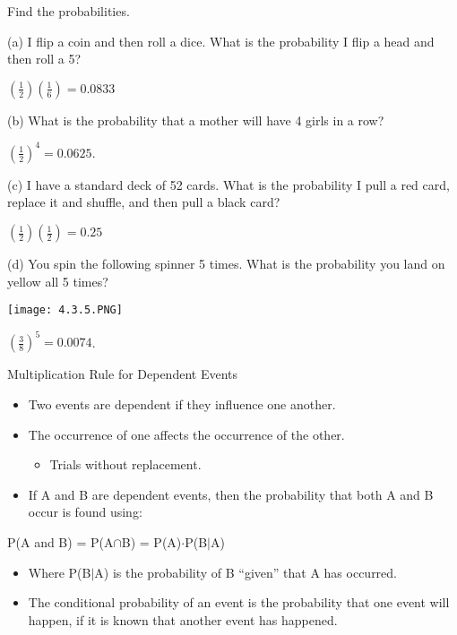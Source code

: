 \documentclass[../stats.tex]{subfiles}
\begin{document}
\begin{example}
    Find the probabilities.

    (a) I flip a coin and then roll a dice. What is the probability I flip a head and then roll a 5?

    $\left(\frac{1}{2}\right)\left(\frac{1}{6}\right) = 0.0833$

    (b) What is the probability that a mother will have 4 girls in a row?

    $\left(\frac{1}{2}\right)^4 = 0.0625$.

    (c) I have a standard deck of 52 cards. What is the probability I pull a red card, replace it and shuffle, and then pull a black card?

    $\left(\frac{1}{2}\right)\left(\frac{1}{2}\right) = 0.25$

    (d) You spin the following spinner 5 times. What is the probability you land on yellow all 5 times?
    \begin{center}
        \texttt{[image: 4.3.5.PNG]}
    \end{center}

    $\left(\frac{3}{8}\right)^5 = 0.0074$.
\end{example}

Multiplication Rule for Dependent Events 
\begin{itemize}
    \item Two events are dependent if they influence one another.
    \item The occurrence of one affects the occurrence of the other.
    \begin{itemize}
        \item Trials without replacement.
    \end{itemize}
    \item If A and B are dependent events, then the probability that both A and B occur is found using:
\end{itemize}
\begin{center}
    P(A and B) = P(A$\cap$B) = P(A)$\cdot$P(B$|$A)
\end{center}
\begin{itemize}
    \item Where P(B$|$A) is the probability of B ``given'' that A has occurred.
    \item The conditional probability of an event is the probability that one event will happen, if it is known that another event has happened.
\end{itemize}
\end{document}
